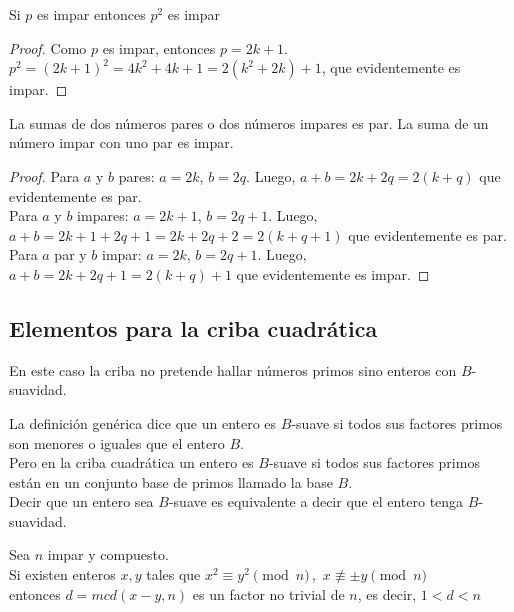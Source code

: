 \begin{enunciado}[$p ^{2}$ impar]\label{enun:p2impar}\leavevmode\par
Si $p$ es impar entonces $p^2$ es impar
\end{enunciado}

\begin{proof}
Como $p$ es impar, entonces $p = 2k+1$. \\
$p ^{2} = (2k+1)^{2} = 4k^{2}+4k+1 = 2(k^{2}+2k)+1$, que evidentemente es impar. 
\end{proof}

\begin{enunciado}\label{enun:parimpar}\leavevmode\par
La sumas de dos números pares o dos números impares es par. La suma de un número impar con uno par es impar.
\end{enunciado}

\begin{proof}
Para $a$ y $b$ pares: $a = 2k$, $b = 2q$. Luego, $a+b = 2k+2q = 2(k+q)$ que evidentemente es par. \\
Para $a$ y $b$ impares: $a = 2k+1$, $b = 2q+1$. Luego, $a+b = 2k+1+2q+1 = 2k+2q+2 = 2(k+q+1)$ que evidentemente es par. \\
Para $a$ par y $b$ impar: $a = 2k$, $b = 2q+1$. Luego, $a+b = 2k+2q+1 = 2(k+q)+1$ que evidentemente es impar.
\end{proof}

\subsection{Elementos para la criba cuadrática}
\label{subsec:Fundcuadratica}
En este caso la criba no pretende hallar números primos sino enteros con $B$-suavidad. 

\begin{definicion} [$B$-suavidad]\label{def:Bsuavidad}
La definición genérica dice que un entero es $B$-suave si todos sus factores primos son menores o iguales que el entero $B$. \\
Pero en la criba cuadrática un entero es $B$-suave si todos sus factores primos están en un conjunto base de primos llamado la base $B$. \\
Decir que un entero sea $B$-suave es equivalente a decir que el entero tenga $B$-suavidad.
\end{definicion}

\begin{enunciado}\label{enun:PpioGeneral}\leavevmode\par
Sea $n$ impar y compuesto. \\
Si existen enteros $x,y$ tales que $x^2 \equiv y^2 \pmod n \,$, $\, x \nequiv \pm  y \pmod n$ \\
entonces $d=mcd(x-y,n)$ es un factor no trivial de $n$, es decir, $1< d <n$
\end{enunciado}

